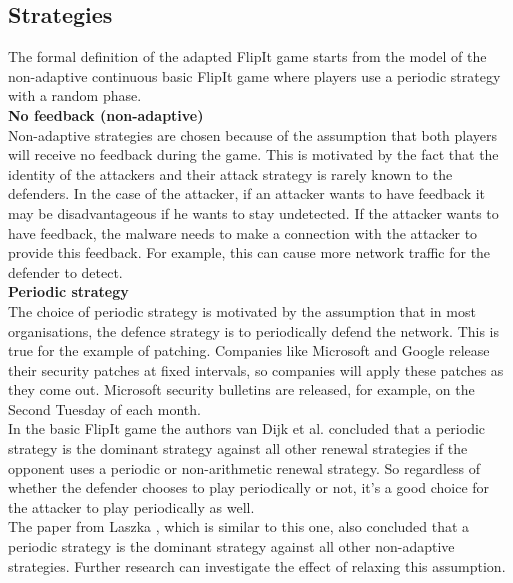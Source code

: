 \subsection{Strategies}
The formal definition of the adapted FlipIt game starts from the model of the non-adaptive continuous basic FlipIt game where players use a periodic strategy with a random phase. \\

\textbf{No feedback (non-adaptive)}\\
Non-adaptive strategies are chosen because of the assumption that both players will receive no feedback during the game. This is motivated by the fact that the identity of the attackers and their attack strategy is rarely known to the defenders. In the case of the attacker, if an attacker wants to have feedback it may be disadvantageous if he wants to stay undetected. If the attacker wants to have feedback, the malware needs to make a connection with the attacker to provide this feedback. For example, this can cause more network traffic for the defender to detect. \\

\textbf{Periodic strategy}\\
The choice of periodic strategy is motivated by the assumption that in most organisations, the defence strategy is to periodically defend the network.  This is true for the example of patching. Companies like Microsoft and Google release their security patches at fixed intervals, so companies will apply these patches as they come out. Microsoft security bulletins are released, for example, on the Second Tuesday of each month. \cite{MicroPatch} \\

In the basic FlipIt game \citep{FlipIt} the authors van Dijk et al. concluded that a periodic strategy is the dominant strategy against all other renewal strategies if the opponent uses a periodic or non-arithmetic renewal strategy.  So regardless of whether the defender chooses to play periodically or not, it's a good choice for the attacker to play periodically as well. \\

The paper from Laszka \citep{MitigationNonTargeted}, which is similar to this one, also concluded that a periodic strategy is the dominant strategy against all other non-adaptive strategies.
Further research can investigate the effect of relaxing this assumption. \\

